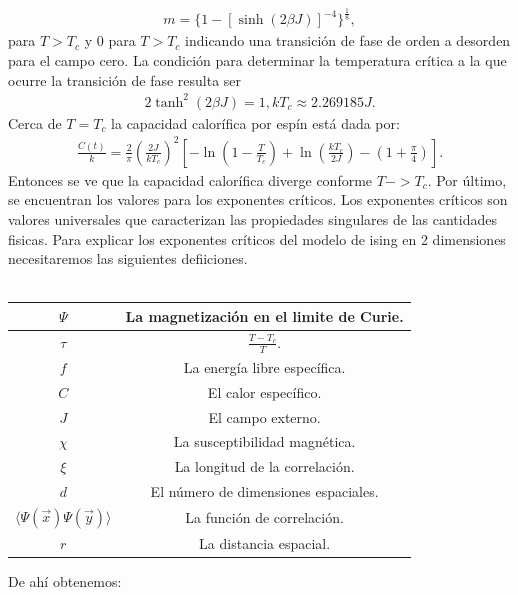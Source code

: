 \documentclass[letterpaper,12pt,oneside]{book}
\begin{document}
%
\begin{eqnarray}
m=\{1-[\sinh(2 \beta J)]^{-4}\}^{\frac{1}{8}},
\end{eqnarray}
%
para $T>T_c$ y 0 para $T>T_c$ indicando una transici\'on de fase de orden a desorden para el campo cero. La condici\'on para determinar la temperatura cr\'itica a la que ocurre la transici\'on de fase  resulta ser
%
\begin{eqnarray}
2\tanh^2(2\beta J)=1,
kT_c \approx 2.269185 J.
\end{eqnarray}
%
Cerca de $T = T_c$ la capacidad calor\'ifica por esp\'in est\'a dada por:
%
\begin{eqnarray}
\frac{C(t)}{k} = \frac{2}{\pi} \left(\frac{2J}{kT_c}\right)^2\left[-\ln\left(1-\frac{T}{T_c}\right)+\ln\left(\frac{kT_c}{2J}\right)-\left(1+\frac{\pi}{4}\right)\right].
\end{eqnarray}
%
Entonces se ve que la capacidad calor\'ifica diverge conforme $T->T_c$.
Por \'ultimo, se encuentran los valores para los exponentes cr\'iticos. Los exponentes cr\'iticos son valores universales que caracterizan las propiedades singulares de las cantidades fisicas. Para explicar los exponentes cr\'iticos del modelo de ising en 2 dimensiones necesitaremos las siguientes defiiciones.\\ 
\\
\begin{center}
\begin{tabular}{ |c|c| } 
\hline
$\Psi$ & La magnetizaci\'on en el limite de Curie.\\ 
\hline
$\tau$ & $\frac{T-T_c}{T}$.\\ 
\hline
$f$ & La energ\'ia libre espec\'ifica.\\
\hline
$C$ & El calor espec\'ifico.\\
\hline
$J$ & El campo externo.\\
\hline
$\chi$ & La susceptibilidad magn\'etica.\\
\hline
$\xi$ & La longitud de la correlaci\'on.\\
\hline
$d$ & El n\'umero de dimensiones espaciales.\\ 
\hline
$\langle \Psi (\vec{x}) \Psi (\vec{y}) \rangle$ & La funci\'on de correlaci\'on. \\
\hline
$r$ & La distancia espacial.\\
\hline
\end{tabular} 
\end{center} 
De ah\'i obtenemos:\\
\\
\end{document}
